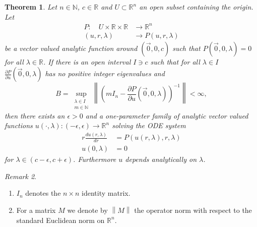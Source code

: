 \documentclass{amsart}
\newtheorem{thm}{Theorem}[section]
\theoremstyle{definition}
\theoremstyle{remark}
\newtheorem{remark}[thm]{Remark}
\numberwithin{equation}{section}
\newcommand{\R}{\mathbb{R}}  %
\newcommand{\N}{\mathbb{N}}
\newcommand{\norm}[1]{\left\lVert#1\right\rVert}
\begin{document}
\begin{thm}
\label{BBgen}
Let $n \in \N$, $c \in \R$ and $U \subset \R^n$ an open subset containing the origin. Let 
\begin{align*}
P: \quad  U \times \R \times \R &\longrightarrow \R^n  \\ 
 	 (u, r, \lambda) &\longrightarrow P(u,r,\lambda)
\end{align*}
be a vector valued analytic function around $(\vec{0}, 0 , c)$ such that $P(\vec{0},0,\lambda) = 0$ for all $\lambda \in \R$. If there is an open interval $I \ni c$ such that for all $\lambda \in I$ $\frac{\partial P}{\partial u}(\vec{0},0, \lambda)$ has no positive integer eigenvalues and
\begin{equation*}
B = \sup\limits_{\substack{\lambda \in I \\ m \in \N} } \norm{ \left(m I_n - \frac{\partial P}{\partial u}(\vec{0},0,\lambda)\right)^{-1} } < \infty,
\end{equation*}
then there exists an $\epsilon > 0$ and a one-parameter family of analytic vector valued functions $u(\cdot, \lambda): (-\epsilon, \epsilon) \rightarrow \R^n$ solving the ODE system
\begin{align}
\label{bb-eqn}
r \frac{d u(r, \lambda) }{d r} &= P(u(r,\lambda),r, \lambda)\\ \nonumber
u(0, \lambda) &= 0
\end{align}
for  $\lambda \in (c- \epsilon, c+ \epsilon)$. Furthermore $u$ depends analytically on $\lambda$.
\end{thm}
\begin{remark}
\begin{enumerate}
\item $I_n$ denotes the $n\times n$ identity matrix.
\item For a matrix $M$ we denote by $\norm{M}$ the operator norm with respect to the standard Euclidean norm on $\R^n$.
\end{enumerate}
\end{remark}
\end{document}
